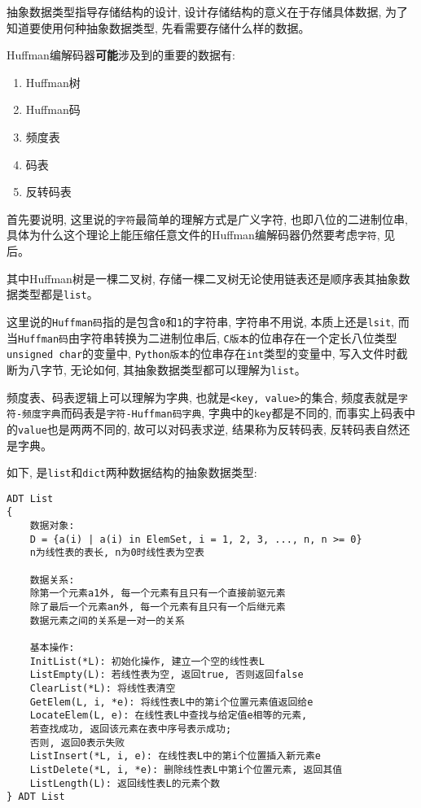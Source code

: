 \documentclass[a4paper]{ctexart}
\begin{document}
抽象数据类型指导存储结构的设计, 设计存储结构的意义在于存储具体数据, 为了知道要使用何种抽象数据类型, 先看需要存储什么样的数据。

Huffman编解码器\textbf{可能}涉及到的重要的数据有:

\begin{enumerate}
\def\labelenumi{\arabic{enumi}.}
\item
  Huffman树
\item
  Huffman码
\item
  频度表
\item
  码表
\item
  反转码表
\end{enumerate}

首先要说明, 这里说的\texttt{字符}最简单的理解方式是广义字符, 也即八位的二进制位串, 具体为什么这个理论上能压缩任意文件的Huffman编解码器仍然要考虑\texttt{字符}, 见后。

其中Huffman树是一棵二叉树, 存储一棵二叉树无论使用链表还是顺序表其抽象数据类型都是\texttt{list}。

这里说的\texttt{Huffman码}指的是包含\texttt{0}和\texttt{1}的字符串, 字符串不用说, 本质上还是\texttt{lsit},
而当\texttt{Huffman码}由字符串转换为二进制位串后, \texttt{C版本}的位串存在一个定长八位类型\texttt{unsigned\ char}的变量中, \texttt{Python版本}的位串存在\texttt{int}类型的变量中, 写入文件时截断为八字节, 无论如何, 其抽象数据类型都可以理解为\texttt{list}。

频度表、码表逻辑上可以理解为字典,
也就是\texttt{\textless{}key,\ value\textgreater{}}的集合, 频度表就是\texttt{字符-频度字典}而码表是\texttt{字符-Huffman码字典}, 字典中的\texttt{key}都是不同的, 而事实上码表中的\texttt{value}也是两两不同的, 故可以对码表求逆, 结果称为反转码表, 反转码表自然还是字典。

如下, 是\texttt{list}和\texttt{dict}两种数据结构的抽象数据类型:

\begin{verbatim}
ADT List
{
    数据对象:
    D = {a(i) | a(i) in ElemSet, i = 1, 2, 3, ..., n, n >= 0}
    n为线性表的表长, n为0时线性表为空表

    数据关系: 
    除第一个元素a1外, 每一个元素有且只有一个直接前驱元素
    除了最后一个元素an外, 每一个元素有且只有一个后继元素
    数据元素之间的关系是一对一的关系

    基本操作:
    InitList(*L): 初始化操作, 建立一个空的线性表L
    ListEmpty(L): 若线性表为空, 返回true, 否则返回false
    ClearList(*L): 将线性表清空
    GetElem(L, i, *e): 将线性表L中的第i个位置元素值返回给e
    LocateElem(L, e): 在线性表L中查找与给定值e相等的元素, 
    若查找成功, 返回该元素在表中序号表示成功; 
    否则, 返回0表示失败
    ListInsert(*L, i, e): 在线性表L中的第i个位置插入新元素e
    ListDelete(*L, i, *e): 删除线性表L中第i个位置元素, 返回其值
    ListLength(L): 返回线性表L的元素个数
} ADT List
\end{verbatim}
\end{document}

